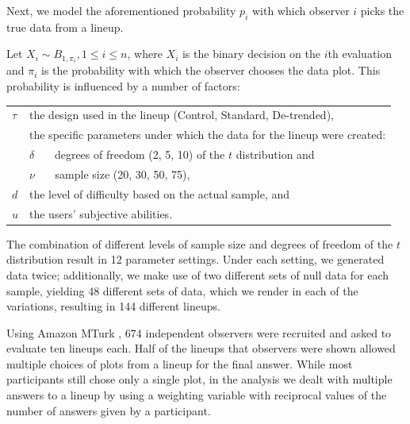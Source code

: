 \documentclass{article}\usepackage[]{graphicx}\usepackage[]{color}
\newcommand{\alnote}[1]{\todo[inline,color=green!40]{#1}}
\begin{document}
Next, we model the aforementioned probability $p_i$ with which observer $i$ picks the true data from a lineup. 




Let $X_i \sim B_{1, \pi_i}, 1 \le i \le n$, where $X_i$ is the binary decision on the $i$th evaluation and $\pi_i$ is the probability with which the observer chooses the data plot. This probability is influenced by a number of factors:

\begin{center}
\begin{tabular}{lp{5in}}
$\tau$ & the design used in the lineup (Control, Standard, De-trended), \\
&  the specific parameters under which the data for the lineup were created: \\
&  $\delta$ \ \ \ degrees of freedom (2, 5, 10) {of the $t$ distribution} and \\
&  $\nu$  \ \ \ sample size (20, 30, 50, 75), \\
$d$ &  the level of difficulty based on the actual sample, and \\
$u$ & the users' subjective abilities.
 \end{tabular}
\end{center}
%

%
The combination of different levels of sample size and degrees of freedom of the $t$ distribution result in 12 parameter settings. Under each setting, we  generated data twice; additionally, we make use of two different sets of null data for each sample, yielding 48 different sets of data, which we render in each of the variations, resulting in 144 different lineups. 


Using  Amazon MTurk \citep{amazon}, 674 independent observers were recruited and asked to evaluate ten lineups each. 
%
Half of the lineups that observers were shown allowed multiple choices of plots from a lineup for the final answer. While most participants still chose only a single plot, in the analysis we dealt with multiple answers to a lineup by using a weighting variable with reciprocal values of the number of answers given by a participant.
\end{document}
